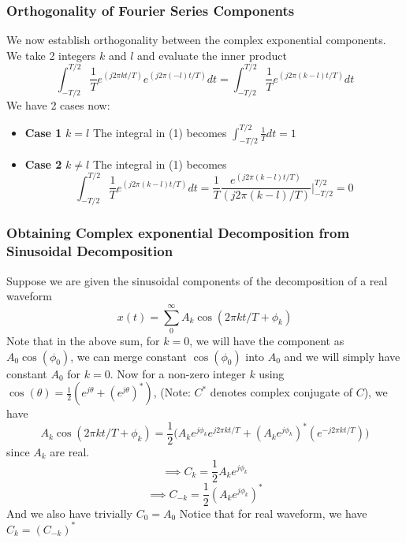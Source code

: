 \subsubsection{Orthogonality of Fourier Series Components}
We now establish orthogonality between the complex exponential components.
We take 2 integers $k$ and $l$ and evaluate the inner product
\begin{equation}
\int_{-T/2}^{T/2}{\frac{1}{T}e^{(j2\pi kt/T)}e^{(j2\pi (-l)t/T)}}dt = \int_{-T/2}^{T/2}{\frac{1}{T}e^{(j2\pi (k-l)t/T)}}dt
\end{equation}
We have 2 cases now:
\begin{itemize}
\item {\bf{Case 1}} $k=l$ The integral in (1) becomes $\int_{-T/2}^{T/2}\frac{1}{T}dt = 1$
\item {\bf{Case 2}} $k \neq l$ The integral in (1) becomes $$\int_{-T/2}^{T/2}{\frac{1}{T}e^{(j2\pi (k-l)t/T)}}dt = \frac{1}{T}\frac{e^{(j2\pi (k-l)t/T)}}{(j2\pi (k-l)/T)}\Bigg|_{-T/2}^{T/2} = 0$$
\end{itemize}
\subsubsection{Obtaining Complex exponential Decomposition from Sinusoidal Decomposition}
Suppose we are given the sinusoidal components of the decomposition of a real waveform $$x(t) = \sum_{0}^{\infty}A_{k}\cos(2\pi kt/T + \phi_{k})$$
Note that in the above sum, for $k = 0$, we will have the component as $A_{0}\cos(\phi_{0})$, we can merge constant $\cos(\phi_{0})$ into $A_{0}$ and we will simply have constant $A_{0}$ for $k = 0$.
Now for a non-zero integer $k$ using $\cos(\theta) = \frac{1}{2}(e^{j\theta} + (e^{j\theta})^{*})$, (Note: $C^{*}$ denotes complex conjugate of $C$), we have $$A_{k}\cos(2\pi kt/T + \phi_{k}) = \frac{1}{2}\Bigg(A_{k}e^{j\phi_{k}}e^{j2\pi kt/T} + (A_{k}e^{j\phi_{k}})^{*} (e^{-j2\pi kt/T})\Bigg)$$
since $A_k$ are real.
$$\implies C_{k} = \frac{1}{2}A_{k}e^{j\phi_{k}}$$
$$\implies C_{-k} = \frac{1}{2}(A_{k}e^{j\phi_{k}})^{*}$$
And we also have trivially $C_{0} = A_{0}$
Notice that for real waveform, we have $C_{k} = (C_{-k})^{*}$


